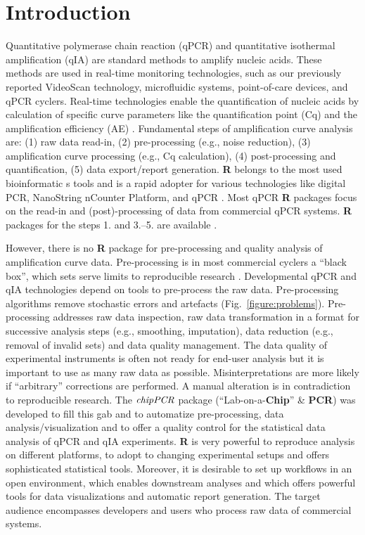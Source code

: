 \documentclass{bioinfo}
\begin{document}
\section{Introduction}

Quantitative polymerase chain reaction (qPCR) and quantitative isothermal 
amplification (qIA) are standard methods to amplify nucleic acids. These methods 
are used in real-time monitoring technologies, such as our previously reported 
VideoScan technology, microfluidic systems, point-of-care devices, and qPCR 
cyclers. Real-time technologies enable the quantification of nucleic acids by 
calculation of specific curve parameters like the quantification point (Cq) and 
the amplification efficiency (AE) 
\citep{roediger_highly_2013,rodiger_nucleic_2014,pabinger_2014}. Fundamental 
steps of amplification curve analysis are: (1) raw data read-in, (2) 
pre-processing (e.g., noise reduction), (3) amplification curve processing 
(e.g., Cq calculation), (4) post-processing and quantification, (5) data 
export/report generation. \textbf{R} belongs to the most used bioinformatic	
s tools and is a rapid adopter for various technologies like digital PCR, 
NanoString nCounter Platform, and qPCR \citep{waggott_2012,pabinger_2014}. Most 
qPCR \textbf{R} packages focus on the read-in and (post)-processing of data from 
commercial qPCR systems. \textbf{R} packages for the steps 1. and 3.--5. are 
available \citep{pabinger_2014,perkins_2012,mccall_2014,gehlenborg_2013}.

However, there is no 
\textbf{R} package for pre-processing and quality analysis of amplification 
curve data. Pre-processing is in most commercial cyclers a ``black box'', which 
sets serve limits to reproducible research \citep{Leeper_2014}. Developmental qPCR and qIA 
technologies depend on tools to pre-process the raw data. Pre-processing 
algorithms remove stochastic errors and artefacts 
(Fig.~\ref{figure:problems}). Pre-processing addresses raw data inspection, 
raw data transformation in a format for successive analysis steps (e.g., 
smoothing, imputation), data reduction (e.g., removal of invalid sets) and data 
quality management. The data quality of experimental instruments is often not 
ready for end-user analysis but it is important to use as many raw data as 
possible. Misinterpretations are more likely if ``arbitrary'' corrections are 
performed. A manual alteration is in contradiction to reproducible research. The 
$\emph{chipPCR}$ package (``Lab-on-a-\textbf{Chip}'' \& \textbf{PCR}) was 
developed to fill this gab and to automatize pre-processing, data analysis/visualization and to offer 
a quality control for the statistical data analysis of qPCR and qIA experiments. 
\textbf{R} is very powerful to reproduce analysis on different platforms, to 
adopt to changing experimental setups and offers sophisticated statistical 
tools. Moreover, it is desirable to set up workflows in an open environment, which 
enables downstream analyses and which offers powerful tools for data 
visualizations and automatic report generation. The target audience encompasses 
developers and users who process raw data of commercial systems.
\end{document}
